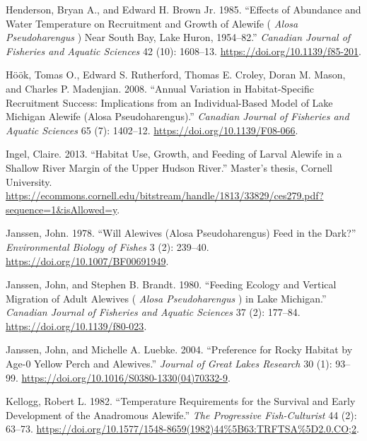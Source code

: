 \documentclass[
]{book}
\newlength{\cslhangindent}
\newlength{\cslentryspacingunit} %
\newenvironment{CSLReferences}[2] %
 {%
  \setlength{\parindent}{0pt}
  \ifodd #1
  \let\oldpar\par
  \def\par{\hangindent=\cslhangindent\oldpar}
  \fi
  \setlength{\parskip}{#2\cslentryspacingunit}
 }%
 {}
\begin{document}
\begin{CSLReferences}{1}{0}
\leavevmode{}%
Henderson, Bryan A., and Edward H. Brown Jr. 1985. {``Effects of {Abundance} and {Water} {Temperature} on {Recruitment} and {Growth} of {Alewife} ( \emph{{Alosa} Pseudoharengus} ) Near {South} {Bay}, {Lake} {Huron}, 1954--82.''} \emph{Canadian Journal of Fisheries and Aquatic Sciences} 42 (10): 1608--13. \url{https://doi.org/10.1139/f85-201}.

\leavevmode{}%
Höök, Tomas O., Edward S. Rutherford, Thomas E. Croley, Doran M. Mason, and Charles P. Madenjian. 2008. {``Annual Variation in Habitat-Specific Recruitment Success: Implications from an Individual-Based Model of {Lake} {Michigan} Alewife ({Alosa} Pseudoharengus).''} \emph{Canadian Journal of Fisheries and Aquatic Sciences} 65 (7): 1402--12. \url{https://doi.org/10.1139/F08-066}.

\leavevmode{}%
Ingel, Claire. 2013. {``Habitat {Use}, {Growth}, and {Feeding} of {Larval} {Alewife} in a {Shallow} {River} {Margin} of the {Upper} {Hudson} {River}.''} Master's thesis, Cornell University. \url{https://ecommons.cornell.edu/bitstream/handle/1813/33829/ces279.pdf?sequence=1\&isAllowed=y}.

\leavevmode{}%
Janssen, John. 1978. {``Will Alewives ({Alosa} Pseudoharengus) Feed in the Dark?''} \emph{Environmental Biology of Fishes} 3 (2): 239--40. \url{https://doi.org/10.1007/BF00691949}.

\leavevmode{}%
Janssen, John, and Stephen B. Brandt. 1980. {``Feeding {Ecology} and {Vertical} {Migration} of {Adult} {Alewives} ( \emph{{Alosa} Pseudoharengus} ) in {Lake} {Michigan}.''} \emph{Canadian Journal of Fisheries and Aquatic Sciences} 37 (2): 177--84. \url{https://doi.org/10.1139/f80-023}.

\leavevmode{}%
Janssen, John, and Michelle A. Luebke. 2004. {``Preference for {Rocky} {Habitat} by {Age}-0 {Yellow} {Perch} and {Alewives}.''} \emph{Journal of Great Lakes Research} 30 (1): 93--99. \url{https://doi.org/10.1016/S0380-1330(04)70332-9}.

\leavevmode{}%
Kellogg, Robert L. 1982. {``Temperature {Requirements} for the {Survival} and {Early} {Development} of the {Anadromous} {Alewife}.''} \emph{The Progressive Fish-Culturist} 44 (2): 63--73. \url{https://doi.org/10.1577/1548-8659(1982)44\%5B63:TRFTSA\%5D2.0.CO;2}.


\end{CSLReferences}
\end{document}
